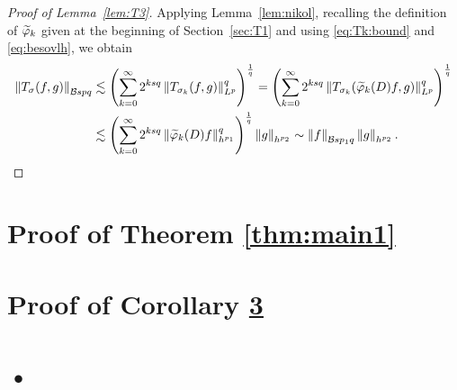 \begin{proof}[Proof of Lemma~\ref{lem:T3}]
Applying Lemma~\ref{lem:nikol}, recalling the definition of $\widetilde{\varphi}_k$ given at the beginning of Section~\ref{sec:T1} and using \eqref{eq:Tk:bound} and \eqref{eq:besovlh}, we obtain
\begin{align*}
\left\|T_\sigma(f,g)\right\|_{\mathcal{B}{s}{p}{q}}&\lesssim \left(\sum_{k=0}^\infty 2^{ksq}\left\|T_{\sigma_k}(f,g)\right\|_{L^p}^q\right)^{\frac{1}{q}}=\left(\sum_{k=0}^\infty 2^{ksq}\left\|T_{\sigma_k}(\widetilde{\varphi}_k(D)f,g)\right\|_{L^p}^q\right)^{\frac{1}{q}}\\
&\lesssim\left(\sum_{k=0}^\infty 2^{ksq}\left\|\widetilde{\varphi}_k(D)f\right\|_{h^{p_1}}^q\right)^{\frac{1}{q}}\left\|g\right\|_{h^{p_2}}\sim \left\|f\right\|_{\mathcal{B}{s}{p_1}{q}}\left\|g\right\|_{h^{p_2}}.
\end{align*}
\end{proof}
\section{Proof of Theorem \ref{thm:main1} }

\section{Proof of Corollary \ref{}}


\section{•}


